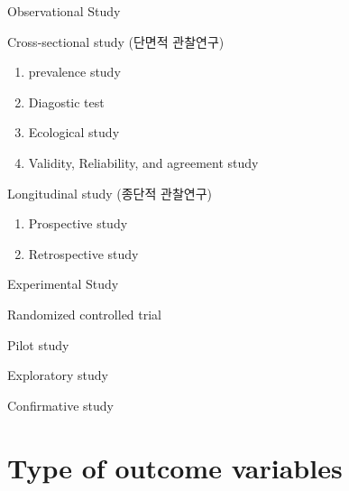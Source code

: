 \documentclass[9pt,ignorenonframetext,xcolor=dvipsnames]{beamer}
\providecommand{\tightlist}{%
  \setlength{\itemsep}{0pt}\setlength{\parskip}{0pt}}
\newlength{\wideitemsep}
\let\olditem\item
\renewcommand{\item}{\setlength{\itemsep}{\wideitemsep}\olditem}
\begin{document}
\begin{frame}{Observational Study}

\begin{block}{Cross-sectional study (단면적 관찰연구)}

\begin{enumerate}
\def\labelenumi{\arabic{enumi}.}
\tightlist
\item
  prevalence study
\item
  Diagostic test
\item
  Ecological study
\item
  Validity, Reliability, and agreement study
\end{enumerate}

\end{block}

\begin{block}{Longitudinal study (종단적 관찰연구)}

\begin{enumerate}
\def\labelenumi{\arabic{enumi}.}
\tightlist
\item
  Prospective study
\item
  Retrospective study
\end{enumerate}

\end{block}

\end{frame}

\begin{frame}{Experimental Study}

\begin{block}{Randomized controlled trial}

\end{block}

\begin{block}{Pilot study}

\end{block}

\begin{block}{Exploratory study}

\end{block}

\begin{block}{Confirmative study}

\end{block}

\end{frame}

\section{Type of outcome variables}\label{type-of-outcome-variables}
\end{document}
